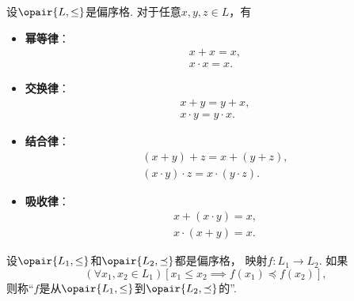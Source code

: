 \begin{theorem}
设\(\opair{L,\leq}\)是偏序格.
对于任意\(x,y,z \in L\)，有\begin{itemize}
	\item {\rm\bf 幂等律}：\begin{gather*}
		x + x = x, \\
		x \cdot x = x.
	\end{gather*}

	\item {\rm\bf 交换律}：\begin{gather*}
		x + y = y + x, \\
		x \cdot y = y \cdot x.
	\end{gather*}

	\item {\rm\bf 结合律}：\begin{gather*}
		(x + y) + z = x + (y + z), \\
		(x \cdot y) \cdot z = x \cdot (y \cdot z).
	\end{gather*}

	\item {\rm\bf 吸收律}：\begin{gather*}
		x + (x \cdot y) = x, \\
		x \cdot (x + y) = x.
	\end{gather*}
\end{itemize}
\end{theorem}

\begin{definition}
设\(\opair{L_1,\leq}\)和\(\opair{L_2,\preceq}\)都是偏序格，
映射\(f\colon L_1 \to L_2\).
如果\[
	(\forall x_1,x_2 \in L_1)
	[
		x_1 \leq x_2
		\implies
		f(x_1) \preceq f(x_2)
	],
\]
则称“\(f\)是从\(\opair{L_1,\leq}\)到\(\opair{L_2,\preceq}\)的”.
\end{definition}
